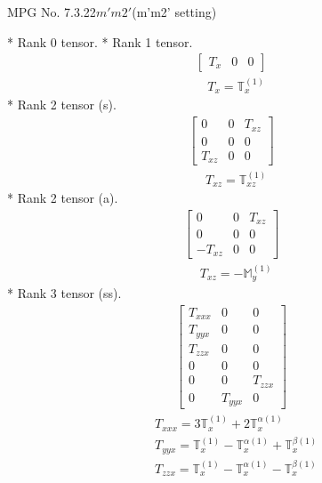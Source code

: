 \documentclass[fleqn,8pt,landscape]{jsarticle}
\begin{document}
\setcounter{MaxMatrixCols}{32}

\renewcommand{\tablename}{Table~}
\renewcommand{\figurename}{Figure~}
\begin{center}
\LARGE
MPG No. 7.3.22\quad$m'm2'$\quad(m'm2' setting)
\end{center}
* Rank 0 tensor.
* Rank 1 tensor.
\begin{align*}
\begin{bmatrix} T_{x} & 0 & 0 \end{bmatrix}
\end{align*}
\begin{align*}
& T_{x} = \mathbb{T}_{x}^{(1)}
\end{align*}
* Rank 2 tensor (s).
\begin{align*}
\begin{bmatrix} 0 & 0 & T_{xz} \\ 0 & 0 & 0 \\ T_{xz} & 0 & 0 \end{bmatrix}
\end{align*}
\begin{align*}
& T_{xz} = \mathbb{T}_{xz}^{(1)}
\end{align*}
* Rank 2 tensor (a).
\begin{align*}
\begin{bmatrix} 0 & 0 & T_{xz} \\ 0 & 0 & 0 \\ - T_{xz} & 0 & 0 \end{bmatrix}
\end{align*}
\begin{align*}
& T_{xz} = - \mathbb{M}_{y}^{(1)}
\end{align*}
* Rank 3 tensor (ss).
\begin{align*}
\begin{bmatrix} T_{xxx} & 0 & 0 \\ T_{yyx} & 0 & 0 \\ T_{zzx} & 0 & 0 \\ 0 & 0 & 0 \\ 0 & 0 & T_{zzx} \\ 0 & T_{yyx} & 0 \end{bmatrix}
\end{align*}
\begin{align*}
& T_{xxx} = 3 \mathbb{T}_{x}^{(1)} + 2 \mathbb{T}_{x}^{\alpha(1)} \\
& T_{yyx} = \mathbb{T}_{x}^{(1)} - \mathbb{T}_{x}^{\alpha(1)} + \mathbb{T}_{x}^{\beta(1)} \\
& T_{zzx} = \mathbb{T}_{x}^{(1)} - \mathbb{T}_{x}^{\alpha(1)} - \mathbb{T}_{x}^{\beta(1)}
\end{align*}
\end{document}
